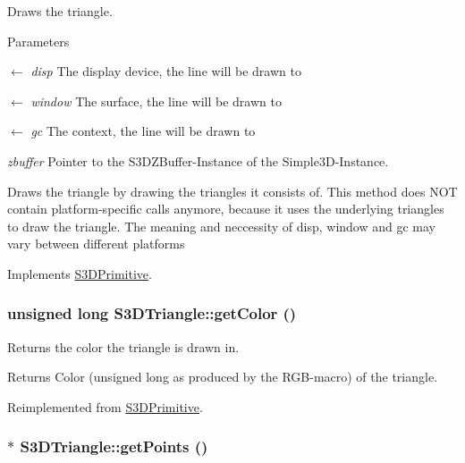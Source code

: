 Draws the triangle. 


\begin{DoxyParams}{Parameters}
\item[\mbox{$\leftarrow$} {\em disp}]The display device, the line will be drawn to \item[\mbox{$\leftarrow$} {\em window}]The surface, the line will be drawn to \item[\mbox{$\leftarrow$} {\em gc}]The context, the line will be drawn to \item[{\em zbuffer}]Pointer to the S3DZBuffer-\/Instance of the Simple3D-\/Instance.\end{DoxyParams}
Draws the triangle by drawing the triangles it consists of. This method does NOT contain platform-\/specific calls anymore, because it uses the underlying triangles to draw the triangle. The meaning and neccessity of disp, window and gc may vary between different platforms 

Implements \hyperlink{class_s3_d_primitive_a857f042bc63ae6233b63b60089e92b81}{S3DPrimitive}.

\hypertarget{class_s3_d_triangle_ade8ba96094206ee3dff5c3bc743e0a1c}{
\subsubsection[{getColor}]{\setlength{\rightskip}{0pt plus 5cm}unsigned long S3DTriangle::getColor ()}}
\label{class_s3_d_triangle_ade8ba96094206ee3dff5c3bc743e0a1c}


Returns the color the triangle is drawn in. 

\begin{DoxyReturn}{Returns}
Color (unsigned long as produced by the RGB-\/macro) of the triangle. 
\end{DoxyReturn}


Reimplemented from \hyperlink{class_s3_d_primitive_a4102845e7754e44c51a87c0fcb391c73}{S3DPrimitive}.

\hypertarget{class_s3_d_triangle_a1032adb6846335a47c8e8c0355b69dbd}{
\subsubsection[{getPoints}]{ $\ast$ S3DTriangle::getPoints ()}}
\label{class_s3_d_triangle_a1032adb6846335a47c8e8c0355b69dbd}



